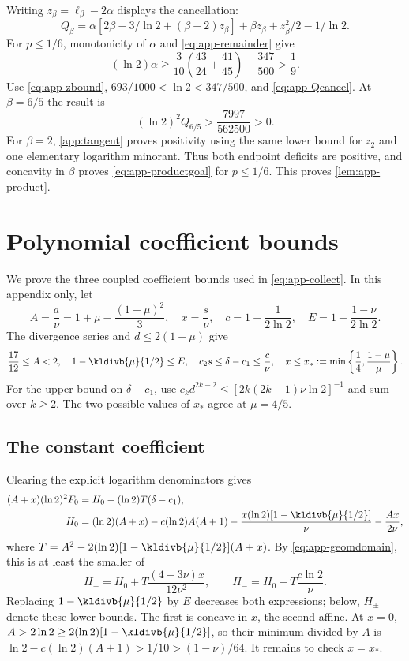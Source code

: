 Writing $z_\beta=\ell_\beta-2\alpha$ displays the cancellation:
\begin{equation}\label{eq:app-Qcancel}
 Q_\beta=\alpha[2\beta-3/\ln2+(\beta+2)z_\beta]
          +\beta z_\beta+z_\beta^2/2-1/\ln2.
\end{equation}
For $p\le1/6$, monotonicity of $\alpha$ and \eqref{eq:app-remainder} give
\[
 (\ln2)\alpha\ge\frac3{10}\left(\frac{43}{24}+\frac{41}{45}\right)
 -\frac{347}{500}>\frac19.
\]
Use \eqref{eq:app-zbound}, $693/1000<\ln2<347/500$, and \eqref{eq:app-Qcancel}.
At $\beta=6/5$ the result is
\[
 (\ln2)^2Q_{6/5}>\frac{7997}{562500}>0.
\]
For $\beta=2$, \autoref{app:tangent} proves positivity using the same lower
bound for $z_2$ and one elementary logarithm minorant. Thus both endpoint
deficits are positive, and concavity in $\beta$ proves
\eqref{eq:app-productgoal} for $p\le1/6$. This proves
\autoref{lem:app-product}.

\section{Polynomial coefficient bounds}\label{app:geometry}
We prove the three coupled coefficient bounds used in \eqref{eq:app-collect}.
In this appendix only, let
\[
 A=\frac a\nu=1+\mu-\frac{(1-\mu)^2}{3},\quad
 x=\frac s\nu,\quad c=1-\frac1{2\ln2},\quad E=1-\frac{1-\nu}{2\ln2}.
\]
The divergence series and $d\le2(1-\mu)$ give
\begin{equation}\label{eq:app-geomdomain}
 \frac{17}{12}\le A<2,\quad 1-\kldivb{\mu}{1/2}\le E,\quad
 c_2s\le \delta-c_1\le\frac c\nu,\quad
 x\le x_*:=\min\left\{\frac14,\frac{1-\mu}{\mu}\right\}.
\end{equation}
For the upper bound on $\delta-c_1$, use
$c_kd^{2k-2}\le[2k(2k-1)\nu\ln2]^{-1}$ and sum over $k\ge2$.
The two possible values of $x_*$ agree at $\mu=4/5$.

\subsection*{The constant coefficient}
Clearing the explicit logarithm denominators gives
\begin{align*}
 (A+x)(\ln2)^2F_0&=H_0+(\ln2)T(\delta-c_1),\\
 H_0&=(\ln2)(A+x)-c(\ln2)A(A+1)
       -\frac{x(\ln2)[1-\kldivb{\mu}{1/2}]}\nu-\frac{Ax}{2\nu},
\end{align*}
where $T=A^2-2(\ln2)[1-\kldivb{\mu}{1/2}](A+x)$. By \eqref{eq:app-geomdomain}, this is at least
the smaller of
\[
 H_+=H_0+T\frac{(4-3\nu)x}{12\nu^2},\qquad H_-=H_0+T\frac{c\ln2}\nu.
\]
Replacing $1-\kldivb{\mu}{1/2}$ by $E$ decreases both expressions; below, $H_\pm$ denote
these lower bounds. The first is concave in $x$, the second affine. At $x=0$,
$A>2\ln2\ge2(\ln2)[1-\kldivb{\mu}{1/2}]$, so their minimum divided by $A$ is $\ln2-c(\ln2)(A+1)>1/10>(1-\nu)/64$.
It remains to check $x=x_*$.

